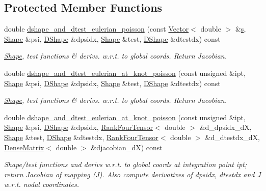 \subsection*{Protected Member Functions}
\begin{DoxyCompactItemize}
\item 
double \hyperlink{classoomph_1_1TPoissonElement_aa15655fd7d9489a77b6d6c82f18946e4}{dshape\+\_\+and\+\_\+dtest\+\_\+eulerian\+\_\+poisson} (const \hyperlink{classoomph_1_1Vector}{Vector}$<$ double $>$ \&\hyperlink{cfortran_8h_ab7123126e4885ef647dd9c6e3807a21c}{s}, \hyperlink{classoomph_1_1Shape}{Shape} \&psi, \hyperlink{classoomph_1_1DShape}{D\+Shape} \&dpsidx, \hyperlink{classoomph_1_1Shape}{Shape} \&test, \hyperlink{classoomph_1_1DShape}{D\+Shape} \&dtestdx) const
\begin{DoxyCompactList}\small\item\em \hyperlink{classoomph_1_1Shape}{Shape}, test functions \& derivs. w.\+r.\+t. to global coords. Return Jacobian. \end{DoxyCompactList}\item 
double \hyperlink{classoomph_1_1TPoissonElement_a957fae1b510200732d7da2594d1a69c2}{dshape\+\_\+and\+\_\+dtest\+\_\+eulerian\+\_\+at\+\_\+knot\+\_\+poisson} (const unsigned \&ipt, \hyperlink{classoomph_1_1Shape}{Shape} \&psi, \hyperlink{classoomph_1_1DShape}{D\+Shape} \&dpsidx, \hyperlink{classoomph_1_1Shape}{Shape} \&test, \hyperlink{classoomph_1_1DShape}{D\+Shape} \&dtestdx) const
\begin{DoxyCompactList}\small\item\em \hyperlink{classoomph_1_1Shape}{Shape}, test functions \& derivs. w.\+r.\+t. to global coords. Return Jacobian. \end{DoxyCompactList}\item 
double \hyperlink{classoomph_1_1TPoissonElement_af4a23d9088cdc834530545fd554ab906}{dshape\+\_\+and\+\_\+dtest\+\_\+eulerian\+\_\+at\+\_\+knot\+\_\+poisson} (const unsigned \&ipt, \hyperlink{classoomph_1_1Shape}{Shape} \&psi, \hyperlink{classoomph_1_1DShape}{D\+Shape} \&dpsidx, \hyperlink{classoomph_1_1RankFourTensor}{Rank\+Four\+Tensor}$<$ double $>$ \&d\+\_\+dpsidx\+\_\+dX, \hyperlink{classoomph_1_1Shape}{Shape} \&test, \hyperlink{classoomph_1_1DShape}{D\+Shape} \&dtestdx, \hyperlink{classoomph_1_1RankFourTensor}{Rank\+Four\+Tensor}$<$ double $>$ \&d\+\_\+dtestdx\+\_\+dX, \hyperlink{classoomph_1_1DenseMatrix}{Dense\+Matrix}$<$ double $>$ \&djacobian\+\_\+dX) const
\begin{DoxyCompactList}\small\item\em Shape/test functions and derivs w.\+r.\+t. to global coords at integration point ipt; return Jacobian of mapping (J). Also compute derivatives of dpsidx, dtestdx and J w.\+r.\+t. nodal coordinates. \end{DoxyCompactList}\item 

\end{DoxyCompactItemize}
